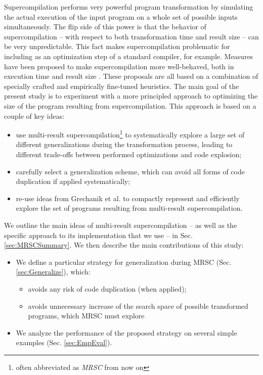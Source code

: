 \documentclass[submission,copyright,creativecommons]{eptcs}
\begin{document}
Supercompilation performs very powerful program transformation by simulating
the actual execution of the input program on a whole set of possible inputs
simultaneously.
The flip side of this power is that the behavior of supercompilation -- 
with respect to both transformation time and result size --
can be very unpredictable.
This fact makes supercompilation problematic for including as an
optimization step of a standard compiler, for example.
Measures have been proposed to make supercompilation more
well-behaved, both in execution time and result size \cite{bolingbroke2011improving,Jonsson2011Taming}.
These proposals are all based on a combination of specially crafted and
empirically fine-tuned heuristics.
The main goal of the present study is to experiment with a more
principled approach to optimizing the size of the program resulting
from supercompilation.
This approach is based on a couple of key ideas:
\begin{itemize}
  \item use multi-result supercompilation\footnote{often abbreviated as \emph{MRSC} from now on} 
    \cite{KlyuchnikovMRSCBranch,Romanenko2014StagedMRSC}
    to systematically explore a large set of different generalizations during 
    the transformation process, 
    leading to different trade-offs between performed optimizations and code explosion;
  \item carefully select a generalization scheme, which can avoid all forms of
    code duplication if applied systematically;
  \item re-use ideas from Grechanik et al. \cite{Romanenko2014StagedMRSC} to compactly represent and efficiently
    explore the set of programs resulting from multi-result supercompilation.
\end{itemize}
We outline the main ideas of multi-result supercompilation --
as well as the specific approach to its implementation that we use --
in Sec. \ref{sec:MRSCSummary}. We then describe the main contributions of this study:
\begin{itemize}
  \item We define a particular strategy for generalization during MRSC (Sec. \ref*{sec:Generalize}), which:
    \begin{itemize}
      \item avoids any risk of code duplication (when applied);
      \item avoids unnecessary increase of the search space of possible
        transformed programs, which MRSC must explore
    \end{itemize}
  \item We analyze the performance of the proposed strategy on several
    simple examples (Sec. \ref*{sec:EmpEval}).
\end{itemize}
\end{document}
